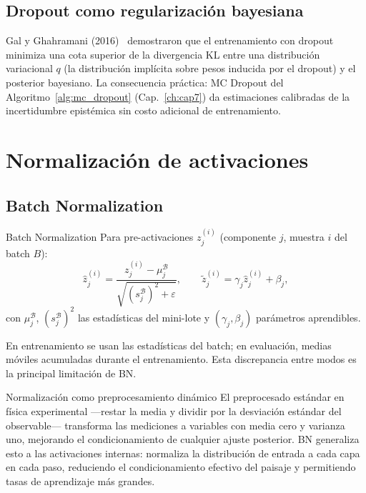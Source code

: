 \subsection{Dropout como regularización bayesiana}
\label{subsec:dropout_bayes}

Gal y Ghahramani (2016)~\cite{gal2016dropout} demostraron que el
entrenamiento con dropout minimiza una cota superior de la divergencia
KL entre una distribución variacional $q$ (la distribución implícita
sobre pesos inducida por el dropout) y el posterior bayesiano. La
consecuencia práctica: MC Dropout del Algoritmo~\ref{alg:mc_dropout}
(Cap.~\ref{ch:cap7}) da estimaciones calibradas de la incertidumbre
epistémica sin costo adicional de entrenamiento.

\section{Normalización de activaciones}
\label{sec:normalizacion}


\subsection{Batch Normalization}
\label{subsec:batch_norm}

\begin{definicion}{Batch Normalization}
\label{def:bn}
Para pre-activaciones $z_j^{(i)}$ (componente $j$, muestra $i$ del
batch $B$):
\begin{equation}
  \hat{z}_j^{(i)} = \frac{z_j^{(i)}-\mu_j^{\mathcal{B}}}
  {\sqrt{(s_j^{\mathcal{B}})^2+\varepsilon}},
  \qquad
  \tilde{z}_j^{(i)} = \gamma_j\hat{z}_j^{(i)} + \beta_j,
  \label{eq:bn}
\end{equation}
con $\mu_j^{\mathcal{B}}$, $(s_j^{\mathcal{B}})^2$ las estadísticas
del mini-lote y $(\gamma_j,\beta_j)$ parámetros aprendibles.
\end{definicion}

En entrenamiento se usan las estadísticas del batch; en evaluación, medias
móviles acumuladas durante el entrenamiento. Esta discrepancia entre modos
es la principal limitación de BN.

\begin{fisicaconexion}{Normalización como preprocesamiento dinámico}
El preprocesado estándar en física experimental —restar la media y dividir
por la desviación estándar del observable— transforma las mediciones a
variables con media cero y varianza uno, mejorando el condicionamiento de
cualquier ajuste posterior. BN generaliza esto a las activaciones internas:
normaliza la distribución de entrada a cada capa en cada paso, reduciendo
el condicionamiento efectivo del paisaje y permitiendo tasas de aprendizaje
más grandes.
\end{fisicaconexion}

